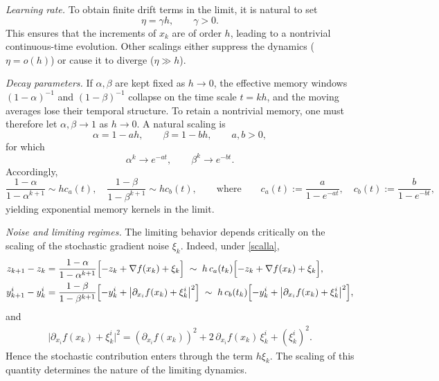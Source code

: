 \documentclass[11pt, a4paper,leqno]{amsart}
\theoremstyle{definition}
\numberwithin{equation}{section}
\begin{document}
\smallskip
\noindent\emph{Learning rate.}
To obtain finite drift terms in the limit, it is natural to set
\[
\eta = \gamma h, \qquad \gamma>0.
\]
This ensures that the increments of $x_k$ are of order $h$, leading to a nontrivial continuous-time evolution. Other scalings either suppress the dynamics ($\eta=o(h)$) or cause it to diverge ($\eta\gg h$).

\smallskip
\noindent\emph{Decay parameters.}
If $\alpha,\beta$ are kept fixed as $h \to 0$, the effective memory windows $(1-\alpha)^{-1}$ and $(1-\beta)^{-1}$ collapse on the time scale $t=kh$, and the moving averages lose their temporal structure. To retain a nontrivial memory, one must therefore let $\alpha,\beta \to 1$ as $h \to 0$. A natural scaling is
\begin{equation}\label{scalla}
\alpha = 1 - a h, \qquad \beta = 1 - b h, \qquad a,b>0,
\end{equation}
for which
\begin{equation}\label{scalla+}
\alpha^{k} \to e^{-at}, \qquad \beta^{k} \to e^{-bt}.
\end{equation}
Accordingly,
\begin{equation}\label{scalla++}
\frac{1-\alpha}{1-\alpha^{k+1}} \sim hc_a(t),
\quad
\frac{1-\beta}{1-\beta^{k+1}} \sim hc_b(t),\qquad\mbox{where}\qquad c_a(t):=\frac {a}{1-e^{-a t}},\quad c_b(t):=\frac {b}{1-e^{-b t}},
\end{equation}
yielding exponential memory kernels in the limit.

\smallskip
\noindent\emph{Noise and limiting regimes.}
The limiting behavior depends critically on the scaling of the stochastic gradient noise $\xi_k$. Indeed, under \eqref{scalla},
\begin{align}\label{Klara1}
z_{k+1}-z_k
&=
\frac{1-\alpha}{1-\alpha^{k+1}}
\Bigl[-z_k+\nabla f(x_k)+\xi_k\Bigr]
\;\sim\;
h\,c_a(t_k)\Bigl[-z_k+\nabla f(x_k)+\xi_k\Bigr],\notag\\
y_{k+1}^i-y_k^i
&=
\frac{1-\beta}{1-\beta^{k+1}}\Bigl[-y_k^i+\big|\partial_{x_i}f(x_k)+\xi_k^i\big|^2\Bigr ]
\;\sim\;
h\,c_b(t_k)\Bigl[-y_k^i+\big|\partial_{x_i} f(x_k)+\xi_k^i\big|^2\Bigr ],\end{align}
and
\begin{align}\label{Klara2}
\bigl|\partial_{x_i}f(x_k)+\xi_k^i\bigr|^2
=
(\partial_{x_i}f(x_k))^2
+
2\,\partial_{x_i}f(x_k)\,\xi_k^i
+
(\xi_k^i)^2.
\end{align}
Hence the stochastic contribution enters through the term $h\xi_k$. The scaling of this quantity determines the nature of the limiting dynamics.
\end{document}
